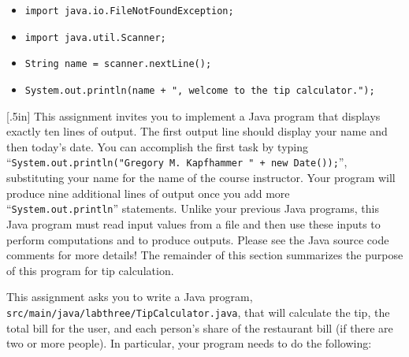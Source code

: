 \documentclass[11pt]{article}
\newcommand{\mainprogramsource}{\lstinline{src/main/java/labthree/TipCalculator.java}}
\newcommand{\command}[1]{``\lstinline{#1}''}
\newcommand{\program}[1]{\lstinline{#1}}
\newcommand{\think}[1]{\null\hfill\LARGE{\faCogs{}}\newline\scriptsize{\em{#1}}}
\begin{document}
\begin{itemize}

  \item \program{import java.io.FileNotFoundException;}
  \item \program{import java.util.Scanner;}
  \item \program{String name = scanner.nextLine();}
  \item \program{System.out.println(name + ", welcome to the tip calculator.");}

\end{itemize}

\marginnote{\think{Research file input}}[.5in] This assignment invites you to
implement a Java program that displays exactly ten lines of output. The first
output line should display your name and then today's date. You can accomplish
the first task by typing \command{System.out.println("Gregory M. Kapfhammer " +
new Date());}, substituting your name for the name of the course instructor.
Your program will produce nine additional lines of output once you add more
\command{System.out.println} statements. Unlike your previous Java programs,
this Java program must read input values from a file and then use these inputs
to perform computations and to produce outputs. Please see the Java source code
comments for more details! The remainder of this section summarizes the purpose
of this program for tip calculation.

This assignment asks you to write a Java program, \mainprogramsource{}, that
will calculate the tip, the total bill for the user, and each person's share of
the restaurant bill (if there are two or more people). In particular, your
program needs to do the following:
\end{document}
